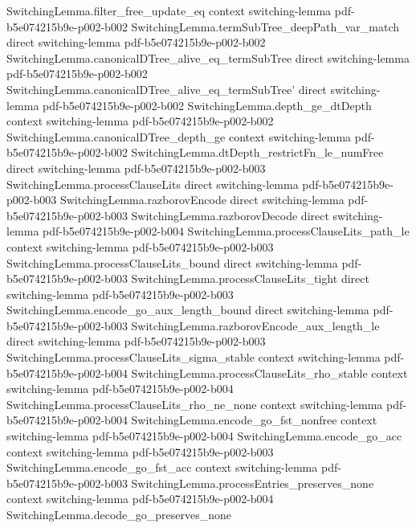 \begin{theorem}
\proofstep
  {SwitchingLemma.filter_free_update_eq}
  {context}
  {switching-lemma}
  {pdf-b5e074215b9e-p002-b002}
\proofstep
  {SwitchingLemma.termSubTree_deepPath_var_match}
  {direct}
  {switching-lemma}
  {pdf-b5e074215b9e-p002-b002}
\proofstep
  {SwitchingLemma.canonicalDTree_alive_eq_termSubTree}
  {direct}
  {switching-lemma}
  {pdf-b5e074215b9e-p002-b002}
\proofstep
  {SwitchingLemma.canonicalDTree_alive_eq_termSubTree'}
  {direct}
  {switching-lemma}
  {pdf-b5e074215b9e-p002-b002}
\proofstep
  {SwitchingLemma.depth_ge_dtDepth}
  {context}
  {switching-lemma}
  {pdf-b5e074215b9e-p002-b002}
\proofstep
  {SwitchingLemma.canonicalDTree_depth_ge}
  {context}
  {switching-lemma}
  {pdf-b5e074215b9e-p002-b002}
\proofstep
  {SwitchingLemma.dtDepth_restrictFn_le_numFree}
  {direct}
  {switching-lemma}
  {pdf-b5e074215b9e-p002-b003}
\proofstep
  {SwitchingLemma.processClauseLits}
  {direct}
  {switching-lemma}
  {pdf-b5e074215b9e-p002-b003}
\proofstep
  {SwitchingLemma.razborovEncode}
  {direct}
  {switching-lemma}
  {pdf-b5e074215b9e-p002-b003}
\proofstep
  {SwitchingLemma.razborovDecode}
  {direct}
  {switching-lemma}
  {pdf-b5e074215b9e-p002-b004}
\proofstep
  {SwitchingLemma.processClauseLits_path_le}
  {context}
  {switching-lemma}
  {pdf-b5e074215b9e-p002-b003}
\proofstep
  {SwitchingLemma.processClauseLits_bound}
  {direct}
  {switching-lemma}
  {pdf-b5e074215b9e-p002-b003}
\proofstep
  {SwitchingLemma.processClauseLits_tight}
  {direct}
  {switching-lemma}
  {pdf-b5e074215b9e-p002-b003}
\proofstep
  {SwitchingLemma.encode_go_aux_length_bound}
  {direct}
  {switching-lemma}
  {pdf-b5e074215b9e-p002-b003}
\proofstep
  {SwitchingLemma.razborovEncode_aux_length_le}
  {direct}
  {switching-lemma}
  {pdf-b5e074215b9e-p002-b003}
\proofstep
  {SwitchingLemma.processClauseLits_sigma_stable}
  {context}
  {switching-lemma}
  {pdf-b5e074215b9e-p002-b004}
\proofstep
  {SwitchingLemma.processClauseLits_rho_stable}
  {context}
  {switching-lemma}
  {pdf-b5e074215b9e-p002-b004}
\proofstep
  {SwitchingLemma.processClauseLits_rho_ne_none}
  {context}
  {switching-lemma}
  {pdf-b5e074215b9e-p002-b004}
\proofstep
  {SwitchingLemma.encode_go_fst_nonfree}
  {context}
  {switching-lemma}
  {pdf-b5e074215b9e-p002-b004}
\proofstep
  {SwitchingLemma.encode_go_acc}
  {context}
  {switching-lemma}
  {pdf-b5e074215b9e-p002-b003}
\proofstep
  {SwitchingLemma.encode_go_fst_acc}
  {context}
  {switching-lemma}
  {pdf-b5e074215b9e-p002-b003}
\proofstep
  {SwitchingLemma.processEntries_preserves_none}
  {context}
  {switching-lemma}
  {pdf-b5e074215b9e-p002-b004}
\proofstep
  {SwitchingLemma.decode_go_preserves_none}

\end{theorem}
